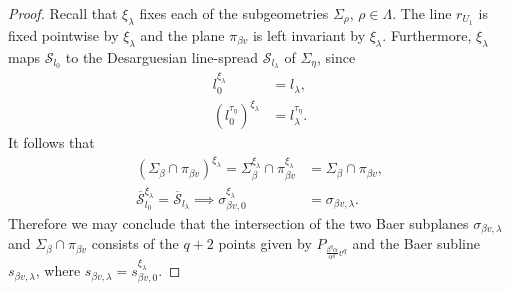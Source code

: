 \documentclass[11pt]{article}
\theoremstyle{definition}
\numberwithin{equation}{section}
\def\cD{\mathcal D}
\def\cS{\mathcal S}
\def\F{{\mathbb F}}
\begin{document}
\begin{proof}
Recall that $\xi_{\lambda}$ fixes each of the subgeometries $\Sigma_{\rho}$, $\rho \in \Lambda$. The line $r_{U_1}$ is fixed pointwise by $\xi_{\lambda}$ and the plane $\pi_{\beta v}$ is left invariant by $\xi_{\lambda}$. Furthermore, $\xi_{\lambda}$ maps $\cS_{l_0}$ to the Desarguesian line-spread $\cS_{l_\lambda}$ of $\Sigma_{\eta}$, since 
\begin{align*}
 l_0^{\xi_{\lambda}} & = l_{\lambda}, \\
 \left(l_0^{\tau_{\eta}}\right)^{\xi_{\lambda}} & = l_\lambda^{\tau_{\eta}}. 
\end{align*}
It follows that 
\begin{align*}
  \left( \Sigma_{\beta} \cap \pi_{\beta v} \right)^{\xi_{\lambda}} =  \Sigma_{\beta}^{\xi_{\lambda}} \cap \pi_{\beta v}^{\xi_{\lambda}} & = \Sigma_{\beta} \cap \pi_{\beta v}, \\
  \overline{\cS}_{l_0}^{\xi_{\lambda}} = \overline{\cS}_{l_\lambda} \implies \sigma_{\beta v, 0}^{\xi_{\lambda}} & = \sigma_{\beta v, \lambda}.
\end{align*}
Therefore we may conclude that the intersection of the two Baer subplanes $\sigma_{\beta v, \lambda}$ and $\Sigma_{\beta} \cap \pi_{\beta v}$ consists of the $q+2$ points given by $P_{\frac{\beta^q \alpha}{\alpha^q} v^q}$ and the Baer subline $s_{\beta v, \lambda}$, where $s_{\beta v, \lambda} = s_{\beta v, 0}^{\xi_{\lambda}}$.
\end{proof}
\end{document}
